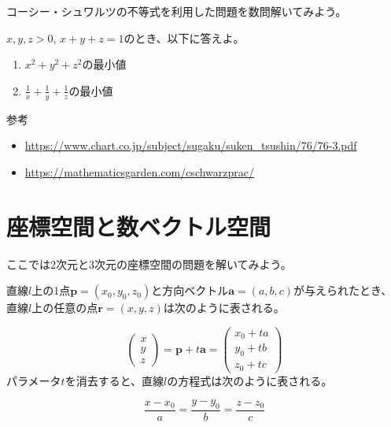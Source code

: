 \documentclass{jlreq}
\begin{document}
コーシー・シュワルツの不等式を利用した問題を数問解いてみよう。

\begin{problem}
	$x, y, z > 0$, $x + y + z = 1$のとき、以下に答えよ。
	\begin{enumerate}
		\item $x^2 + y^2 + z^2$の最小値
		\item $\frac{1}{x} + \frac{1}{y} + \frac{1}{z}$の最小値
	\end{enumerate}
\end{problem}

参考
\begin{itemize}
  \item \url{https://www.chart.co.jp/subject/sugaku/suken_tsushin/76/76-3.pdf}
  \item \url{https://mathematicsgarden.com/cschwarzprac/}
\end{itemize}

\section{座標空間と数ベクトル空間}
ここでは2次元と3次元の座標空間の問題を解いてみよう。

\begin{theorembox}[直線のパラメータ表示]
  直線$l$上の1点$\boldsymbol{p} = (x_0, y_0, z_0)$と方向ベクトル$\boldsymbol{a} = (a, b, c)$が与えられたとき、直線$l$上の任意の点$\boldsymbol{r} = (x, y, z)$は次のように表される。

  \begin{equation*}
    \begin{pmatrix}
      x \\ y \\ z 
    \end{pmatrix}
    = \boldsymbol{p} + t \boldsymbol{a} = 
    \begin{pmatrix}
      x_0 + t a \\ y_0 + t b \\ z_0 + t c
    \end{pmatrix}
  \end{equation*}
  パラメータ$t$を消去すると、直線$l$の方程式は次のように表される。

  \begin{equation*}
    \frac{x - x_0}{a} = \frac{y - y_0}{b} = \frac{z - z_0}{c}
  \end{equation*}
\end{theorembox}
\end{document}
